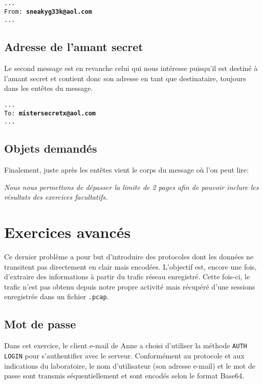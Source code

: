 \documentclass[11pt,a4paper]{article}
\begin{document}
\texttt{... \\ From: \textbf{sneakyg33k@aol.com} \\ ...}

\subsection{Adresse de l'amant secret}

Le second message est en revanche celui qui nous intéresse puisqu'il est destiné à l'amant secret et contient donc son adresse en tant que destinataire, toujours dans les entêtes du message.

\texttt{... \\ To: \textbf{mistersecretx@aol.com} \\ ...}

\subsection{Objets demandés}

Finalement, juste après les entêtes vient le corps du message où l'on peut lire:



\newpage

\emph{\footnotesize 
Nous nous permettons de dépasser la limite de 2 pages afin de pouvoir inclure les résultats des exercices facultatifs.
}

\section{Exercices avancés}

Ce dernier problème a pour but d'introduire des protocoles dont les données ne transitent pas directement en clair mais encodées. L'objectif est, encore une fois, d'extraire des informations à partir du trafic réseau enregistré. Cette fois-ci, le trafic n'est pas obtenu depuis notre propre activité mais récupéré d'une sessions enregistrée dans un fichier \texttt{.pcap}.

\subsection{Mot de passe}

Dans cet exercice, le client e-mail de Anne a choisi d'utiliser la méthode \texttt{AUTH LOGIN} pour s'authentifier avec le serveur. Conformément au protocole et aux indications du laboratoire, le nom d'utilisateur (son adresse e-mail) et le mot de passe sont transmis séquentiellement et sont encodés selon le format Base64.
\end{document}

